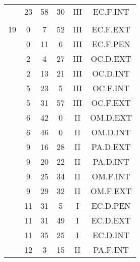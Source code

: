 \documentclass[12pt, a4paper]{article}
\begin{document}
\begin{multicols}{3}
{\begin{tabular}{c c c c c c}
	 	 	 	 & 23 & 58 & 30 & III & EC.F.INT\\%
	 	 	 	 & & & & & \\%
	 	 	 	19 & 0 & 7 & 52 & III & EC.F.EXT\\%
	 	 	 	 & 0 & 11 & 6 & III & EC.F.PEN\\%
	 	 	 	 & 2 & 4 & 27 & III & OC.D.EXT\\%
	 	 	 	 & 2 & 13 & 21 & III & OC.D.INT\\%
	 	 	 	 & 5 & 23 & 5 & III & OC.F.INT\\%
	 	 	 	 & 5 & 31 & 57 & III & OC.F.EXT\\%
	 	 	 	 & 6 & 42 & 0 & II & OM.D.EXT\\%
	 	 	 	 & 6 & 46 & 0 & II & OM.D.INT\\%
	 	 	 	 & 9 & 16 & 28 & II & PA.D.EXT\\%
	 	 	 	 & 9 & 20 & 22 & II & PA.D.INT\\%
	 	 	 	 & 9 & 25 & 34 & II & OM.F.INT\\%
	 	 	 	 & 9 & 29 & 32 & II & OM.F.EXT\\%
	 	 	 	 & 11 & 31 & 5 & I & EC.D.PEN\\%
	 	 	 	 & 11 & 31 & 49 & I & EC.D.EXT\\%
	 	 	 	 & 11 & 35 & 25 & I & EC.D.INT\\%
	 	 	 	 & 12 & 3 & 15 & II & PA.F.INT\\%
	 	 \end{tabular}
 	}
\end{multicols}
\end{document}
